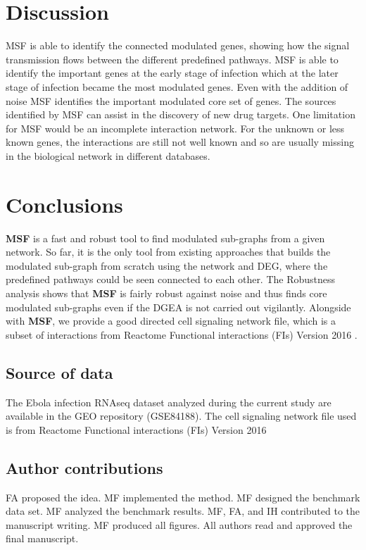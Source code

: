 \documentclass[10pt,a4paper,twocolumn]{article}
\begin{document}
\section*{Discussion}

MSF is able to identify the connected modulated genes, showing how the
signal transmission flows between the different predefined pathways. MSF is
able to identify the important genes at the early stage of infection which
at the later stage of infection became the most modulated genes. Even with
the addition of noise MSF identifies the important modulated core set of
genes. The sources identified by MSF can assist in the discovery of new
drug targets. One limitation for MSF would be an incomplete interaction
network. For the unknown or less known genes, the interactions are still
not well known and so are usually missing in the biological network in
different databases.


\section*{Conclusions}

\textbf{MSF} is a fast and robust tool to find modulated sub-graphs
from a given network. So far, it is the only tool from existing
approaches that builds the modulated sub-graph from scratch using the
network and DEG, where the predefined pathways could be seen connected
to each other. The Robustness analysis shows that \textbf{MSF} is
fairly robust against noise and thus finds core modulated sub-graphs
even if the DGEA is not carried out vigilantly. Alongside with
\textbf{MSF}, we provide a good directed cell signaling network file,
which is a subset of interactions from Reactome Functional
interactions (FIs) Version 2016 .

\subsection*{Source of data}

The Ebola infection RNAseq dataset analyzed during the current study are
available in the GEO repository (GSE84188). The cell signaling network file
used is from Reactome Functional interactions (FIs) Version 2016


\subsection*{Author contributions}
FA proposed the idea. MF implemented the method. MF designed the benchmark
data set. MF analyzed the benchmark results. MF, FA, and IH contributed to
the manuscript writing. MF produced all figures. All authors read and
approved the final manuscript.
\end{document}
